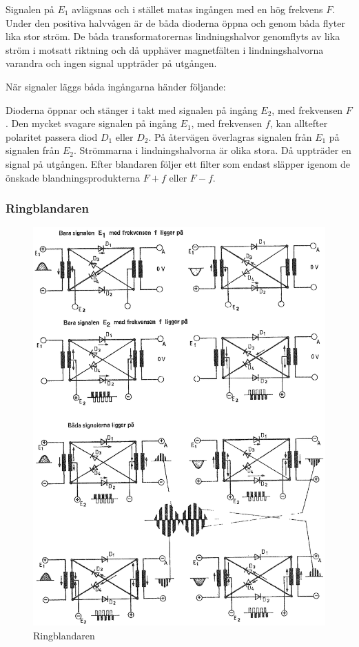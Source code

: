 Signalen på \(E_1\) avlägsnas och i stället matas ingången med en hög
frekvens \(F\).
Under den positiva halvvågen är de båda dioderna öppna och genom båda flyter
lika stor ström.
De båda transformatorernas lindningshalvor genomflyts av lika ström i motsatt
riktning och då upphäver magnetfälten i lindningshalvorna varandra och ingen
signal uppträder på utgången.

När signaler läggs båda ingångarna händer följande:

Dioderna öppnar och stänger i takt med signalen på ingång \(E_2\), med
frekvensen \(F\).
Den mycket svagare signalen på ingång \(E_1\), med frekvensen \(f\), kan
alltefter polaritet passera diod \(D_1\) eller \(D_2\).
På återvägen överlagras signalen från \(E_1\) på signalen från \(E_2\).
Strömmarna i lindningshalvorna är olika stora.
Då uppträder en signal på utgången.
Efter blandaren följer ett filter som endast släpper igenom de önskade
blandningsprodukterna \(F + f\) eller \(F - f\).

\subsubsection{Ringblandaren}

\begin{figure}
\includegraphics[width=\textwidth]{images/cropped_pdfs/bild_2_3-86.pdf}
\caption{Ringblandaren}
\label{fig:BildII3-86}
\end{figure}


